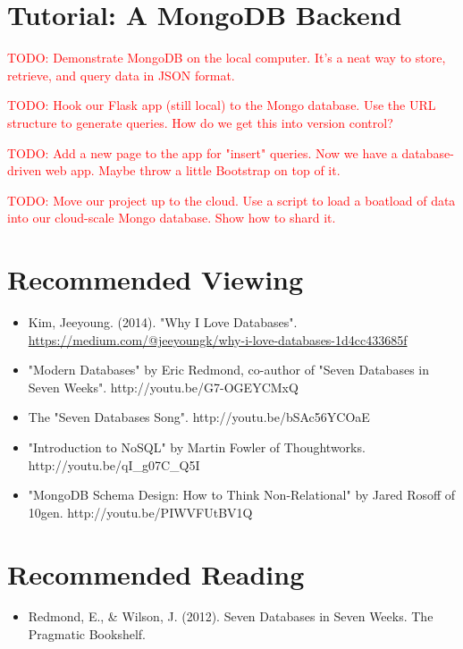 \documentclass[11pt]{book}
\newcommand{\todo}[1]{\textcolor{red}{TODO: #1}} %
\begin{document}
\section*{Tutorial: A MongoDB Backend}

\todo{Demonstrate MongoDB on the local computer.  It's a neat way to store, retrieve, and query data in JSON format.}

\todo{Hook our Flask app (still local) to the Mongo database. Use the URL structure to generate queries. How do we get this into version control?}

\todo{Add a new page to the app for "insert" queries.  Now we have a database-driven web app.  Maybe throw a little Bootstrap on top of it.}

\todo{Move our project up to the cloud.  Use a script to load a boatload of data into our cloud-scale Mongo database.  Show how to shard it.}

\section*{Recommended Viewing}
\begin{itemize}
    \item Kim, Jeeyoung. (2014). "Why I Love Databases". \url{https://medium.com/@jeeyoungk/why-i-love-databases-1d4cc433685f}
    \item "Modern Databases" by Eric Redmond, co-author of "Seven Databases in Seven Weeks".  http://youtu.be/G7-OGEYCMxQ
    \item The "Seven Databases Song".  http://youtu.be/bSAc56YCOaE
    \item "Introduction to NoSQL" by Martin Fowler of Thoughtworks.\\ http://youtu.be/qI\_g07C\_Q5I
    \item "MongoDB Schema Design: How to Think Non-Relational" by Jared Rosoff of 10gen.  http://youtu.be/PIWVFUtBV1Q
\end{itemize}

\section*{Recommended Reading}
\begin{itemize}
    \item Redmond, E., \& Wilson, J. (2012). Seven Databases in Seven Weeks.  The Pragmatic Bookshelf.
\end{itemize}
\end{document}
